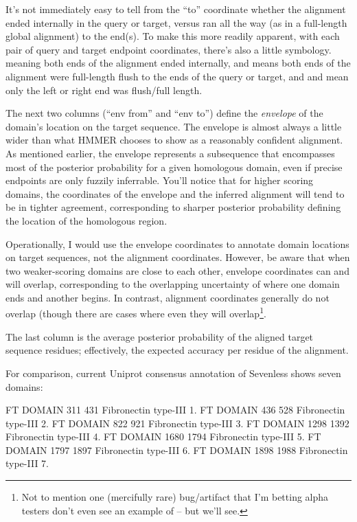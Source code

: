 It's not immediately easy to tell from the ``to'' coordinate whether
the alignment ended internally in the query or target, versus ran all
the way (as in a full-length global alignment) to the end(s). To make
this more readily apparent, with each pair of query and target
endpoint coordinates, there's also a little symbology. 
meaning both ends of the alignment ended internally, and \prog{[]}
means both ends of the alignment were full-length flush to the ends of
the query or target, and \prog{[.} and \prog{.]} mean only the left or
right end was flush/full length. 

The next two columns (``env from'' and ``env to'') define the
\emph{envelope} of the domain's location on the target sequence.  The
envelope is almost always a little wider than what HMMER chooses to
show as a reasonably confident alignment. As mentioned earlier, the
envelope represents a subsequence that encompasses most of the
posterior probability for a given homologous domain, even if precise
endpoints are only fuzzily inferrable. You'll notice that for higher
scoring domains, the coordinates of the envelope and the inferred
alignment will tend to be in tighter agreement, corresponding to
sharper posterior probability defining the location of the homologous
region. 

Operationally, I would use the envelope coordinates to annotate domain
locations on target sequences, not the alignment coordinates. However,
be aware that when two weaker-scoring domains are close to each other,
envelope coordinates can and will overlap, corresponding to the
overlapping uncertainty of where one domain ends and another begins.
In contrast, alignment coordinates generally do not overlap (though
there are cases where even they will overlap\footnote{Not to mention
one (mercifully rare) bug/artifact that I'm betting alpha testers
don't even see an example of -- but we'll see.}.

The last column is the average posterior probability of the aligned
target sequence residues; effectively, the expected accuracy per
residue of the alignment.

For comparison, current Uniprot consensus annotation of Sevenless
shows seven domains:

\begin{sreoutput}
FT   DOMAIN      311    431       Fibronectin type-III 1.
FT   DOMAIN      436    528       Fibronectin type-III 2.
FT   DOMAIN      822    921       Fibronectin type-III 3.
FT   DOMAIN     1298   1392       Fibronectin type-III 4.
FT   DOMAIN     1680   1794       Fibronectin type-III 5.
FT   DOMAIN     1797   1897       Fibronectin type-III 6.
FT   DOMAIN     1898   1988       Fibronectin type-III 7.
\end{sreoutput}

